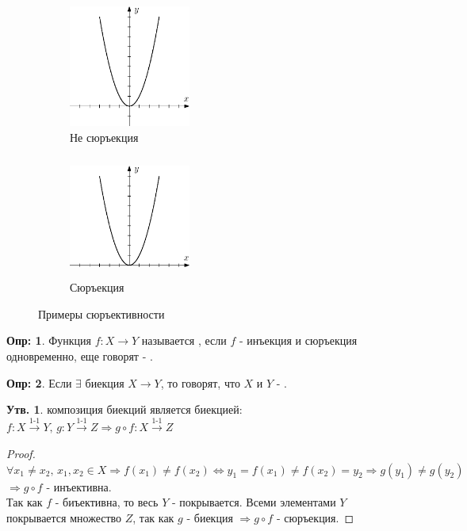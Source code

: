 \documentclass[12pt]{article}
\theoremstyle{definition}
\newtheorem{defn}{Опр:}
\newtheorem{prop}{Утв.}
\begin{document}
\begin{figure}[H]
	\centering
	\begin{subfigure}[b]{0.5\textwidth}
		\centering
		\includegraphics[width=4cm, height = 4cm]{4_2.eps}
		\caption{Не сюръекция}
		\label{4_2}
	\end{subfigure}
	\begin{subfigure}[b]{0.49\textwidth}
		\centering
		\includegraphics[width=4cm, height = 4cm]{4_3.eps}
		\caption{Сюръекция}
		\label{4_3}
	\end{subfigure}

	\caption{Примеры сюръективности}
	\label{fig:Сюръективность}
\end{figure}

\begin{defn}
Функция $f\colon X \rightarrow Y$ называется , если $f$ - инъекция и сюръекция одновременно, еще говорят - .
\end{defn}
\begin{defn}
Если $\exists$ биекция $X\rightarrow Y$, то говорят, что $X$ и $Y$ - .
\end{defn}

\begin{prop} композиция биекций является биекцией:\\
$f\colon X \xrightarrow{\text{1-1}} Y,\, g\colon Y \xrightarrow{\text{1-1}} Z \Rightarrow g\circ f\colon X \xrightarrow{\text{1-1}} Z$
\end{prop}
\begin{proof}
$\forall x_1 \neq x_2,\, x_1, x_2 \in X \Rightarrow f(x_1) \neq f(x_2) \Longleftrightarrow y_1 = f(x_1) \neq f(x_2) = y_2 \Rightarrow g(y_1) \neq g(y_2) $\\ 
$\Rightarrow g\circ f$ - инъективна.\\
Так как $f$ - биъективна, то весь $Y$ - покрывается. Всеми элементами $Y$ покрывается множество $Z$, так как $g$ - биекция $\Rightarrow g\circ f$ - сюръекция.
\end{proof}
\end{document}
